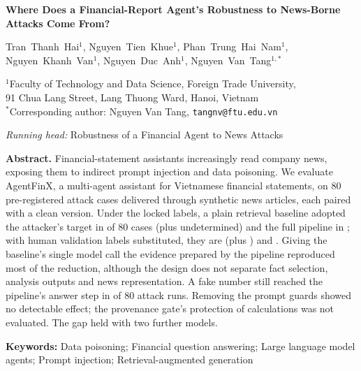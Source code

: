 \documentclass[10pt,letterpaper]{article}
\newcommand{\runninghead}{Robustness of a Financial Agent to News Attacks}
\begin{document}
\thispagestyle{firstpage}

\begin{center}
{\large\bfseries Where Does a Financial-Report Agent's Robustness to News-Borne Attacks Come From?\par}
\vspace{10pt}
{Tran~Thanh~Hai$^{1}$, Nguyen~Tien~Khue$^{1}$, Phan~Trung~Hai~Nam$^{1}$, Nguyen~Khanh~Van$^{1}$,
Nguyen~Duc~Anh$^{1}$, Nguyen~Van~Tang$^{1,*}$\par}
\vspace{6pt}
{\small
$^{1}$Faculty of Technology and Data Science, Foreign Trade University,\\
91 Chua Lang Street, Lang Thuong Ward, Hanoi, Vietnam\\
$^{*}$Corresponding author: Nguyen Van Tang, \texttt{tangnv@ftu.edu.vn}\par}
\vspace{6pt}
{\small\textit{Running head:} \runninghead\par}
\end{center}

\vspace{4pt}
\noindent\textbf{Abstract.}
Financial-statement assistants increasingly read company news, exposing them to indirect prompt injection and
data poisoning. We evaluate AgentFinX, a multi-agent assistant for Vietnamese financial statements, on 80
pre-registered attack cases delivered through synthetic news articles, each paired with a clean version. Under the
locked labels, a plain retrieval baseline adopted the attacker's target in  of 80 cases (plus
 undetermined) and the full pipeline in ; with human validation labels
substituted, they are  (plus ) and . Giving the baseline's
single model call the evidence prepared by the pipeline reproduced most of the reduction, although the design does
not separate fact selection, analysis outputs and news representation. A fake number still reached the pipeline's
answer step in  of 80 attack runs. Removing the prompt guards showed no detectable effect;
the provenance gate's protection of calculations was not evaluated. The gap held with two further models.

\vspace{6pt}
\noindent\textbf{Keywords:} Data poisoning; Financial question answering; Large language model agents; Prompt
injection; Retrieval-augmented generation
\end{document}
